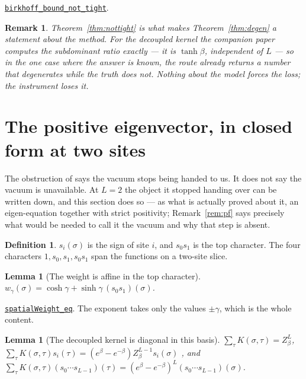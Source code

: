 \documentclass[11pt]{article}
\newtheorem{lemma}[theorem]{Lemma}
\newtheorem{remark}[theorem]{Remark}
\theoremstyle{definition}
\newtheorem{definition}[theorem]{Definition}
\newcommand{\anchor}{a70426f4c8a0ed733b4eee94fb01b158bc81fd08}
\newcommand{\osline}[3]{%
  \href{https://github.com/lluiseriksson/THE-ERIKSSON-PROGRAMME/blob/\anchor/YangMills/OS/#1.lean\#L#2}{\nolinkurl{#3}}}
\begin{document}
\osline{SpatialBirkhoff}{237}{birkhoff\_bound\_not\_tight}.

\begin{remark}
Theorem~\ref{thm:nottight} is what makes Theorem~\ref{thm:degen} a statement
about the \emph{method}.  For the decoupled kernel the companion paper computes
the subdominant ratio exactly --- it is $\tanh\beta$, independent of $L$ --- so
in the one case where the answer is known, the route already returns a number
that degenerates while the truth does not.  Nothing about the model forces the
loss; the instrument loses it.
\end{remark}

\section{The positive eigenvector, in closed form at two sites}

The obstruction of \cite{ErikssonSpatial} says the vacuum stops being handed
to us.  It does not say the vacuum is unavailable.  At $L=2$ the object it
stopped handing over can be written down, and this section does so --- as what
is actually proved about it, an eigen-equation together with strict positivity;
Remark~\ref{rem:pf} says precisely what would be needed to call it the vacuum
and why that step is absent.

\begin{definition}
$s_i(\sigma)$ is the sign of site $i$, and $s_0s_1$ is the top character.  The
four characters $1,s_0,s_1,s_0s_1$ span the functions on a two-site slice.
\end{definition}

\begin{lemma}[The weight is affine in the top character]\label{lem:affine}
$w_\gamma(\sigma)=\cosh\gamma+\sinh\gamma\,(s_0s_1)(\sigma)$.
\end{lemma}

\osline{SpatialPerron}{153}{spatialWeight\_eq}.  The exponent takes only the
values $\pm\gamma$, which is the whole content.

\begin{lemma}[The decoupled kernel is diagonal in this basis]\label{lem:diag}
$\sum_\tau K(\sigma,\tau)=Z_\beta^{L}$,
$\sum_\tau K(\sigma,\tau)s_i(\tau)=(e^\beta-e^{-\beta})Z_\beta^{L-1}s_i(\sigma)$
\emph{\cite{ErikssonSpatial}}, and
$\sum_\tau K(\sigma,\tau)(s_0\cdots s_{L-1})(\tau)
 = (e^\beta-e^{-\beta})^{L}(s_0\cdots s_{L-1})(\sigma)$.
\end{lemma}
\end{document}
